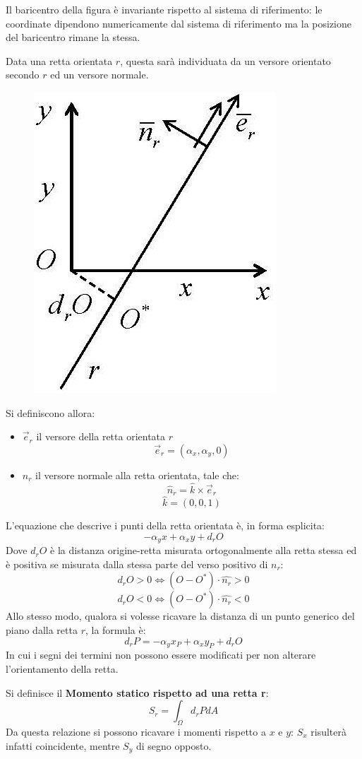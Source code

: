 \documentclass{article}
\begin{document}
\begin{adjustwidth}{2in}{}
	Il baricentro della figura è invariante rispetto al sistema di riferimento: le coordinate dipendono numericamente dal sistema di riferimento ma la posizione del baricentro rimane la stessa. \newline 
	
	
\newpage
	Data una retta orientata $ r $, questa sarà individuata da un versore orientato secondo $r$ ed un versore normale. 

\begin{figure}[H]
	\centering
	\includegraphics[width=0.25\linewidth]{immagini/1.PARTE7_Pagina_68}
\end{figure}
	Si definiscono allora:
	\begin{itemize}
		\item $ \vec{e}_r $ il versore della retta orientata $ r $
				\[ \vec{e}_r = (\alpha_x, \alpha_y, 0)\]
		\item $ \hat{n}_r $ il versore normale alla retta orientata, tale che:
				\[ \hat{n}_r = \hat{k} \times \vec{e}_r\]
				\[ \hat{k} = (0,0,1)\]
	\end{itemize}

	L’equazione che descrive i punti della retta orientata è, in forma esplicita:
	\[  -\alpha_y x + \alpha_x y + d_r O\]
	Dove $ d_r O$ è la distanza origine-retta misurata ortogonalmente alla retta stessa ed è positiva se misurata dalla stessa parte del verso positivo di $ n_r $:
	\[ d_r O>0 \Leftrightarrow (O-O^*) \cdot \hat{n_r} >0  \]
	\[ d_r O<0 \Leftrightarrow (O-O^*) \cdot \hat{n_r} <0  \]
	Allo stesso modo, qualora si volesse ricavare la distanza di un punto generico del piano dalla retta $r$, la formula è:
	\[ d_r P = -\alpha_y x_P + \alpha_x y_P + d_r O \]
	In cui i segni dei termini non possono essere modificati per non alterare l’orientamento della retta.\newline
	
	Si definisce il \textbf{Momento statico rispetto ad una retta r}:
	\[  S_r = \int_{\Omega} d_r P dA\]
	Da questa relazione si possono ricavare i momenti rispetto a $ x $ e $ y $: $ S_x $ risulterà infatti coincidente, mentre $ S_y $ di segno opposto. 
	

\end{adjustwidth}
\end{document}
